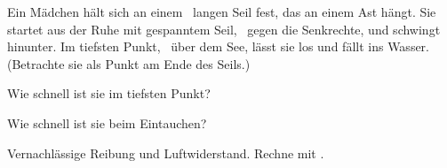 Ein Mädchen hält sich an einem \lSO\ langen Seil fest, das an einem Ast hängt. Sie startet aus der Ruhe mit gespanntem Seil, \waO\ gegen die Senkrechte, und schwingt hinunter. Im tiefsten Punkt, \dSO\ über dem See, lässt sie los und fällt ins Wasser. (Betrachte sie als Punkt am Ende des Seils.)

\begin{abcliste}
\abc
Wie schnell ist sie im tiefsten Punkt?

\abc
Wie schnell ist sie beim Eintauchen?
\end{abcliste}

Vernachlässige Reibung und Luftwiderstand. Rechne mit \gO.
